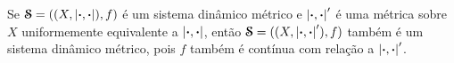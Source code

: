 Se $\bm{\mathcal{S}}=((X,\left\vert{\bm{\cdot}},{\bm{\cdot}}\right\vert),f)$ é um sistema dinâmico métrico e $\left\vert{\bm{\cdot}},{\bm{\cdot}}\right\vert'$ é uma métrica sobre $X$ uniformemente equivalente a $\left\vert{\bm{\cdot}},{\bm{\cdot}}\right\vert$, então $\bm{\mathcal{S}}=((X,\left\vert{\bm{\cdot}},{\bm{\cdot}}\right\vert'),f)$ também é um sistema dinâmico métrico, pois $f$ também é contínua com relação a $\left\vert{\bm{\cdot}},{\bm{\cdot}}\right\vert'$.

%
%
%

